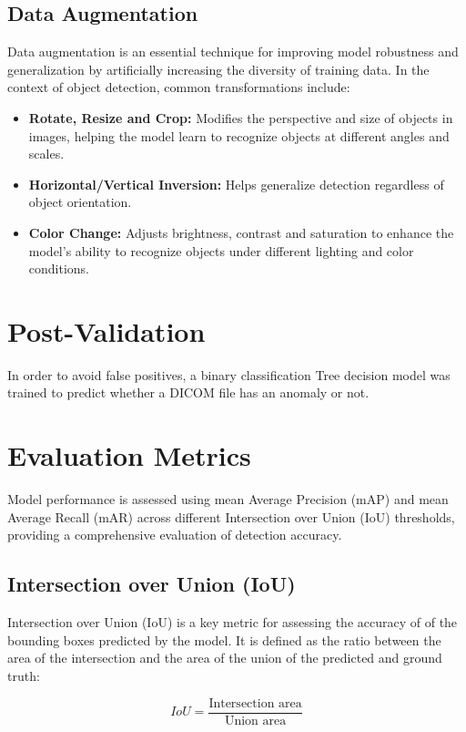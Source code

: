 \documentclass[12pt,oneside]{book} %
\begin{document}
\subsection{Data Augmentation}
Data augmentation is an essential technique for improving model robustness and
generalization by artificially increasing the diversity of training data. In
the context of object detection, common transformations include:
\begin{itemize}
    \item \textbf{Rotate, Resize and Crop:} Modifies the perspective and size of objects in
          images, helping the model learn to recognize objects at different angles and
          scales.
    \item \textbf{Horizontal/Vertical Inversion:} Helps generalize detection regardless of object
          orientation.
    \item \textbf{Color Change:} Adjusts brightness, contrast and saturation to enhance the
          model's ability to recognize objects under different lighting and color
          conditions.
\end{itemize}

\section{Post-Validation}
In order to avoid false positives, a binary classification Tree decision model
was trained to predict whether a DICOM file has an anomaly or not.

\newpage
\section{Evaluation Metrics}
Model performance is assessed using mean Average Precision (mAP) and mean
Average Recall (mAR) across different Intersection over Union (IoU) thresholds,
providing a comprehensive evaluation of detection accuracy.

\subsection{Intersection over Union (IoU)}

Intersection over Union (IoU) is a key metric for assessing the accuracy of of
the bounding boxes predicted by the model. It is defined as the ratio between
the area of the intersection and the area of the union of the predicted and
ground truth:

\begin{equation}
    IoU = \frac{\text{Intersection area}}{\text{Union area}}
\end{equation}
\end{document}
